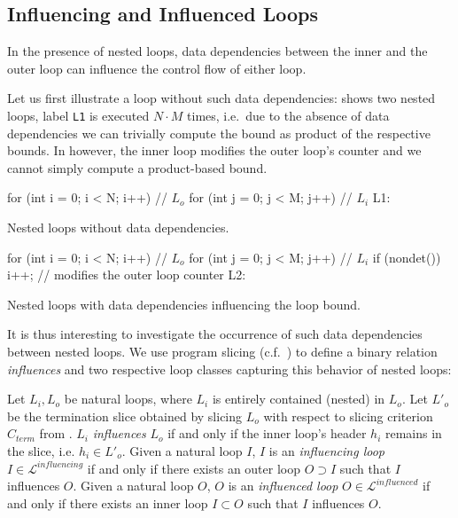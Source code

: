 \subsection{Influencing and Influenced Loops}

In the presence of nested loops, data dependencies between the inner and the outer loop can influence the control flow of either loop. 
\begin{example}
    Let us first illustrate a loop without such data dependencies:  shows two nested loops, label \texttt{L1} is executed $N \cdot M$ times, i.e.\ due to the absence of data dependencies we can trivially compute the bound as product of the respective bounds. In  however, the inner loop modifies the outer loop's counter and we cannot simply compute a product-based bound.
\end{example}

\begin{listing}
\begin{ccode}
for (int i = 0; i < N; i++) {      // $L_o$
    for (int j = 0; j < M; j++) {  // $L_i$
L1:
    }
}
\end{ccode}
\caption{Nested loops without data dependencies.}
\label{lst:nodeps}
\end{listing}

\begin{listing}
\begin{ccode}
for (int i = 0; i < N; i++) {      // $L_o$
    for (int j = 0; j < M; j++) {  // $L_i$
        if (nondet()) {
            i++; // modifies the outer loop counter
        }
L2: 
    }
}
\end{ccode}
\caption{Nested loops with data dependencies influencing the loop bound.}
\label{lst:deps}
\end{listing}

It is thus interesting to investigate the occurrence of such data dependencies between nested loops. We use program slicing (c.f.\ ) to define a binary relation \emph{influences} and two respective loop classes capturing this behavior of nested loops:

\begin{definition}
    \label{def:infl}
    Let $L_{i}, L_{o}$ be natural loops, where $L_{i}$ is entirely contained (nested) in $L_{o}$. Let $L'_{o}$ be the termination slice obtained by slicing $L_{o}$ with respect to slicing criterion $C_{term}$ from . $L_{i}$ \emph{influences} $L_{o}$ if and only if the inner loop's header $h_i$ remains in the slice, i.e. $h_i \in L'_{o}$. Given a natural loop $I$, $I$ is an \emph{influencing loop} $I \in \mathcal{L}^{influencing}$ if and only if there exists an outer loop $O \supset I$ such that $I$ influences $O$. Given a natural loop $O$, $O$ is an \emph{influenced loop} $O \in \mathcal{L}^{influenced}$ if and only if there exists an inner loop $I \subset O$ such that $I$ influences $O$.
\end{definition}

